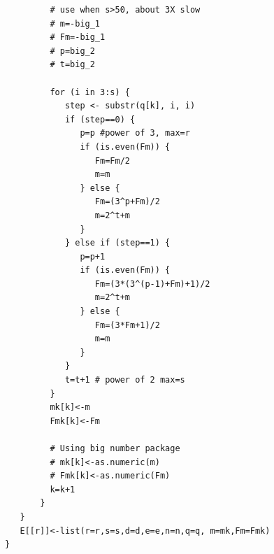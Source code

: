 \documentclass{amsart}
\theoremstyle{definition}
\theoremstyle{remark}
\numberwithin{equation}{section}
\begin{document}
\begin{lstlisting}
         # use when s>50, about 3X slow
         # m=-big_1
         # Fm=-big_1
         # p=big_2
         # t=big_2
			
         for (i in 3:s) {
            step <- substr(q[k], i, i)
            if (step==0) {
               p=p #power of 3, max=r
               if (is.even(Fm)) {
                  Fm=Fm/2
                  m=m
               } else {
                  Fm=(3^p+Fm)/2
                  m=2^t+m
               }
            } else if (step==1) {
               p=p+1
               if (is.even(Fm)) {
                  Fm=(3*(3^(p-1)+Fm)+1)/2
                  m=2^t+m
               } else {
                  Fm=(3*Fm+1)/2
                  m=m
               }
            }
            t=t+1 # power of 2 max=s   
         }
         mk[k]<-m
         Fmk[k]<-Fm
			
         # Using big number package  
         # mk[k]<-as.numeric(m)
         # Fmk[k]<-as.numeric(Fm)
         k=k+1
       }
   }
   E[[r]]<-list(r=r,s=s,d=d,e=e,n=n,q=q, m=mk,Fm=Fmk)
}

\end{lstlisting}


\normalsize	
\end{document}
